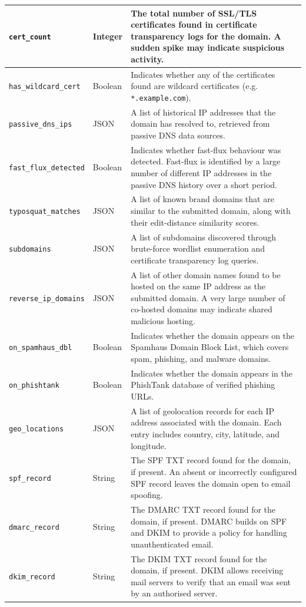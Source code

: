 \documentclass[12pt, a4paper, oneside]{report}
\begin{document}
\begin{longtable}{|p{4.5cm}|p{2cm}|p{7.5cm}|}
\hline
\texttt{cert\_count} & Integer & The total number of SSL/TLS certificates found in certificate transparency logs for the domain. A sudden spike may indicate suspicious activity. \\
\hline
\texttt{has\_wildcard\_cert} & Boolean & Indicates whether any of the certificates found are wildcard certificates (e.g. \texttt{*.example.com}). \\
\hline
\texttt{passive\_dns\_ips} & JSON & A list of historical IP addresses that the domain has resolved to, retrieved from passive DNS data sources. \\
\hline
\texttt{fast\_flux\_detected} & Boolean & Indicates whether fast-flux behaviour was detected. Fast-flux is identified by a large number of different IP addresses in the passive DNS history over a short period. \\
\hline
\texttt{typosquat\_matches} & JSON & A list of known brand domains that are similar to the submitted domain, along with their edit-distance similarity scores. \\
\hline
\texttt{subdomains} & JSON & A list of subdomains discovered through brute-force wordlist enumeration and certificate transparency log queries. \\
\hline
\texttt{reverse\_ip\_domains} & JSON & A list of other domain names found to be hosted on the same IP address as the submitted domain. A very large number of co-hosted domains may indicate shared malicious hosting. \\
\hline
\texttt{on\_spamhaus\_dbl} & Boolean & Indicates whether the domain appears on the Spamhaus Domain Block List, which covers spam, phishing, and malware domains. \\
\hline
\texttt{on\_phishtank} & Boolean & Indicates whether the domain appears in the PhishTank database of verified phishing URLs. \\
\hline
\texttt{geo\_locations} & JSON & A list of geolocation records for each IP address associated with the domain. Each entry includes country, city, latitude, and longitude. \\
\hline
\texttt{spf\_record} & String & The SPF TXT record found for the domain, if present. An absent or incorrectly configured SPF record leaves the domain open to email spoofing. \\
\hline
\texttt{dmarc\_record} & String & The DMARC TXT record found for the domain, if present. DMARC builds on SPF and DKIM to provide a policy for handling unauthenticated email. \\
\hline
\texttt{dkim\_record} & String & The DKIM TXT record found for the domain, if present. DKIM allows receiving mail servers to verify that an email was sent by an authorised server. \\
\hline
\end{longtable}
\end{document}
